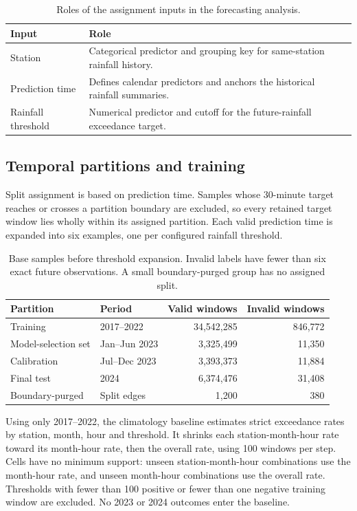 \documentclass[11pt,a4paper]{article}
\begin{document}
\begin{table}[htbp]
\centering\small
\caption{Roles of the assignment inputs in the forecasting analysis.}
\label{tab:prediction-inputs}
\begin{tabularx}{\linewidth}{l >{\raggedright\arraybackslash}X}
\toprule
Input & Role \\
\midrule
Station & Categorical predictor and grouping key for same-station rainfall
history. \\
Prediction time & Defines calendar predictors and anchors the historical
rainfall summaries. \\
Rainfall threshold & Numerical predictor and cutoff for the future-rainfall
exceedance target. \\
\bottomrule
\end{tabularx}
\end{table}

\subsection{Temporal partitions and training}
Split assignment is based on prediction time. Samples whose 30-minute target
reaches or crosses a partition boundary are excluded, so every retained target
window lies wholly within its assigned partition. Each valid prediction time
is expanded into six examples, one per configured rainfall threshold.

\begin{table}[htbp]
\centering\small
\caption{Base samples before threshold expansion. Invalid labels have fewer
than six exact future observations. A small boundary-purged group has no
assigned split.}
\label{tab:splits}
\begin{tabular}{l l r r}
\toprule
Partition & Period & Valid windows & Invalid windows \\
\midrule
Training & 2017--2022 & 34,542,285 & 846,772 \\
Model-selection set & Jan--Jun 2023 & 3,325,499 & 11,350 \\
Calibration & Jul--Dec 2023 & 3,393,373 & 11,884 \\
Final test & 2024 & 6,374,476 & 31,408 \\
Boundary-purged & Split edges & 1,200 & 380 \\
\bottomrule
\end{tabular}
\end{table}

Using only 2017--2022, the climatology baseline estimates strict exceedance
rates by station, month, hour and threshold. It shrinks each station-month-hour
rate toward its month-hour rate, then the overall rate, using 100 windows per
step. Cells have no minimum support: unseen station-month-hour combinations
use the month-hour rate, and unseen month-hour combinations use the overall
rate. Thresholds with fewer than 100 positive or fewer than one negative
training window are excluded. No 2023 or 2024 outcomes enter the baseline.
\end{document}
